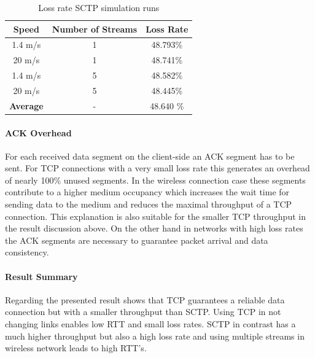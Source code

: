 \documentclass[a4paper]{article}
\begin{document}
\begin{table}[H]
\centering
\begin{tabular}{ccc}

\textbf{Speed} & \textbf{Number of Streams}  & \textbf{Loss Rate} \\ 
\hline 
\hline
1.4 m/s & 1 & 48.793\% \\ 
20 m/s  & 1 & 48.741\% \\ 
\hline
1.4 m/s & 5 & 48.582\% \\
20 m/s  & 5 & 48.445\% \\
 \hline
\textbf{Average} & - & 48.640 \%\\ 
\end{tabular} 
\caption{Loss rate SCTP simulation runs}
\label{table:loss-rate-sctp}
\end{table}

\paragraph{ACK Overhead}

For each received data segment on the client-side an ACK segment has to be sent. For TCP connections with a very small loss rate this generates an overhead of nearly 100\% unused segments. In the wireless connection case these segments contribute to a higher medium occupancy which increases the wait time for sending data to the medium and reduces the maximal throughput of a TCP connection. This explanation is also suitable for the smaller TCP throughput in the result discussion above. On the other hand in networks with high loss rates the ACK segments are necessary to guarantee packet arrival and data consistency. 


\paragraph{Result Summary}

Regarding the presented result shows that TCP guarantees a reliable data connection but with a smaller throughput than SCTP. Using TCP in not changing links enables low RTT and small loss rates. SCTP in contrast has a much higher throughput but also a high loss rate and using multiple streams in wireless network leads to high RTT's.
\end{document}
